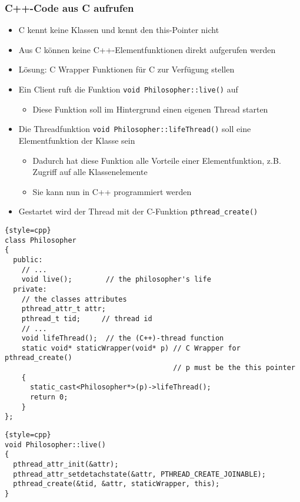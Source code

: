 \subsubsection{C++-Code aus C aufrufen}
\begin{itemize}
	\item C kennt keine Klassen und kennt den this-Pointer nicht
	\item Aus C können keine C++-Elementfunktionen direkt aufgerufen werden
	\item Lösung: C Wrapper Funktionen für C zur Verfügung stellen
	\item Ein Client ruft die Funktion \lstinline{void Philosopher::live()} auf
	\begin{itemize}
		\item Diese Funktion soll im Hintergrund einen eigenen Thread starten
	\end{itemize}
	\item Die Threadfunktion \lstinline{void Philosopher::lifeThread()} soll eine Elementfunktion der Klasse sein
	\begin{itemize}
		\item Dadurch hat diese Funktion alle Vorteile einer Elementfunktion, z.B. Zugriff auf alle Klassenelemente
		\item Sie kann nun in C++ programmiert werden
	\end{itemize}
	\item Gestartet wird der Thread mit der C-Funktion \lstinline{pthread_create()}
\end{itemize}
\begin{lstlisting}{style=cpp}
class Philosopher
{
  public:
    // ...
    void live();        // the philosopher's life
  private:
    // the classes attributes
    pthread_attr_t attr;
    pthread_t tid;     // thread id
    // ...
    void lifeThread();	// the (C++)-thread function
    static void* staticWrapper(void* p) // C Wrapper for pthread_create()
                                        // p must be the this pointer
    {
      static_cast<Philosopher*>(p)->lifeThread();
      return 0;
    }
};
\end{lstlisting}
\begin{lstlisting}{style=cpp}
void Philosopher::live()
{
  pthread_attr_init(&attr);
  pthread_attr_setdetachstate(&attr, PTHREAD_CREATE_JOINABLE);
  pthread_create(&tid, &attr, staticWrapper, this);
}
\end{lstlisting}
